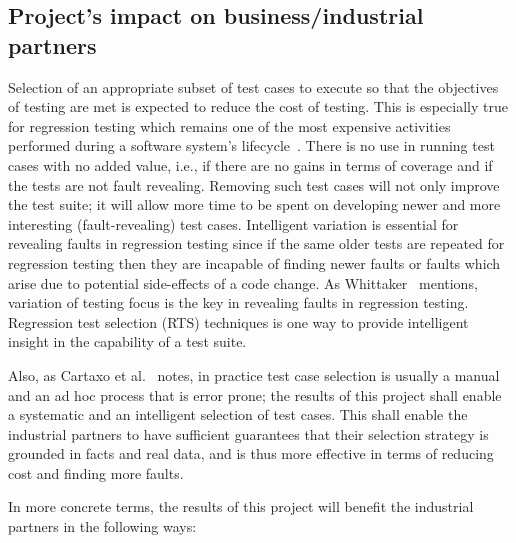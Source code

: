 \documentclass[11pt, oneside]{article}   	%
\begin{document}
\subsection{Project's impact on business/industrial partners}\label{sec:impact_industry}
Selection of an appropriate subset of test cases to execute so that the objectives of testing are met is expected to reduce the cost of testing. This is especially true for regression testing which remains one of the most expensive activities performed during a software system's lifecycle~\cite{Harrold99}. There is no use in running test cases with no added value, i.e., if there are no gains in terms of coverage and if the tests are not fault revealing. Removing such test cases will not only improve the test suite; it will allow more time to be spent on developing newer and more interesting (fault-revealing) test cases. Intelligent variation is essential for revealing faults in regression testing since if the same older tests are repeated for regression testing then they are incapable of finding newer faults or faults which arise due to potential side-effects of a code change. As Whittaker~\cite{Whittaker09} mentions, variation of testing focus is the key in revealing faults in regression testing. Regression test selection (RTS) techniques is one way to provide intelligent insight in the capability of a test suite.

Also, as Cartaxo et al.~\cite{Cartaxo11} notes, in practice test case selection is usually a manual and an ad hoc process that is error prone; the results of this project shall enable a systematic and an intelligent selection of test cases. This shall enable the industrial partners to have sufficient guarantees that their selection strategy is grounded in facts and real data, and is thus more effective in terms of reducing cost and finding more faults. 


In more concrete terms, the results of this project will benefit the industrial partners in the following ways:
\end{document}
